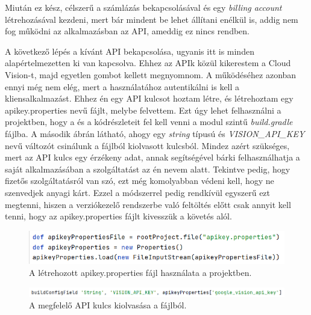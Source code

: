 Miután ez kész, célszerű a számlázás bekapcsolásával és egy \emph{billing account} létrehozásával kezdeni, mert bár mindent be lehet állítani enélkül is, addig nem fog működni az alkalmazásban az API, ameddig ez nincs rendben.

A következő lépés a kívánt API bekapcsolása, ugyanis itt is minden alapértelmezetten ki van kapcsolva. Ehhez az APIk közül kikerestem a Cloud Vision-t, majd egyetlen gombot kellett megnyomnom. A működéséhez azonban ennyi még nem elég, mert a használatához autentikálni is kell a kliensalkalmazást. Ehhez én egy API kulcsot hoztam létre, és létrehoztam egy apikey.properties nevű fájlt, melybe felvettem. Ezt úgy lehet felhasználni a projektben, hogy a  és a  kódrészleteit fel kell venni a modul szintű \emph{build.gradle} fájlba. A második ábrán látható, ahogy egy \emph{string} típusú és \emph{VISION\_API\_KEY} nevű változót csinálunk a fájlból kiolvasott kulcsból. Mindez azért szükséges, mert az API kulcs egy érzékeny adat, annak segítségével bárki felhasználhatja a saját alkalmazásában a szolgáltatást az én nevem alatt. Tekintve pedig, hogy fizetős szolgáltatásról van szó, ezt még komolyabban védeni kell, hogy ne szenvedjek anyagi kárt. Ezzel a módszerrel pedig rendkívül egyszerű ezt megtenni, hiszen a verziókezelő rendszerbe való feltöltés előtt csak annyit kell tenni, hogy az apikey.properties fájlt kivesszük a követés alól.

\begin{figure}[!ht]
	\centering
	\includegraphics[width=120mm, keepaspectratio]{figures/gradle_apikey.png}
	\caption{A létrehozott apikey.properties fájl használata a projektben.}
	\label{fig:ApiKey}
\end{figure}

\begin{figure}[!ht]
	\centering
	\includegraphics[width=150mm, keepaspectratio]{figures/apikey_configfield.png}
	\caption{A megfelelő API kulcs kiolvasása a fájlból.}
	\label{fig:ApiKeyConfig}
\end{figure}

